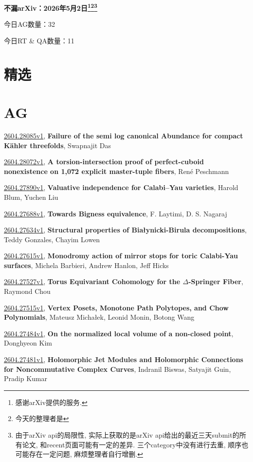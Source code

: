 \documentclass[9pt, a4paper]{article}
\theoremstyle{plain}
\theoremstyle{definition}
\theoremstyle{remark}
\newcommand{\arxiv}[3]{\href{https://arxiv.org/abs/#1}{#1}, \textbf{\textcolor{arxivblue}{#2}}, #3}
\newcommand{\AGnumber}{32}
\newcommand{\RTQAnumber}{11}
\newcommand{\NewestDate}{2026年5月2日}
\newcommand{\todayarXiver}{} %
\begin{document}
\begin{center}
    \Huge\textbf{不漏arXiv：\NewestDate\footnote{感谢arXiv提供的服务.}\footnote{今天的整理者是\todayarXiver}\footnote{由于arXiv api的局限性, 实际上获取的是arXiv api给出的最近三天submit的所有论文, 和recent页面可能有一定的差异. 三个category中没有进行去重, 顺序也可能存在一定问题, 麻烦整理者自行增删.}} \\
\end{center}

\setcounter{section}{-1}

\begin{center}
    今日AG数量：\AGnumber
    
    今日RT \& QA数量：\RTQAnumber
    
\end{center}


\section{精选}


\section{AG}
\arxiv{2604.28085v1}{Failure of the semi log canonical Abundance for compact Kähler threefolds}{Swapnajit Das}

\arxiv{2604.28072v1}{A torsion-intersection proof of perfect-cuboid nonexistence on 1,072 explicit master-tuple fibers}{René Peschmann}

\arxiv{2604.27890v1}{Valuative independence for Calabi--Yau varieties}{Harold Blum, Yuchen Liu}

\arxiv{2604.27688v1}{Towards Bigness equivalence}{F. Laytimi, D. S. Nagaraj}

\arxiv{2604.27634v1}{Structural properties of Białynicki-Birula decompositions}{Teddy Gonzales, Chayim Lowen}

\arxiv{2604.27615v1}{Monodromy action of mirror stops for toric Calabi-Yau surfaces}{Michela Barbieri, Andrew Hanlon, Jeff Hicks}

\arxiv{2604.27527v1}{Torus Equivariant Cohomology for the $Δ$-Springer Fiber}{Raymond Chou}

\arxiv{2604.27515v1}{Vertex Posets, Monotone Path Polytopes, and Chow Polynomials}{Mateusz Michałek, Leonid Monin, Botong Wang}

\arxiv{2604.27484v1}{On the normalized local volume of a non-closed point}{Donghyeon Kim}

\arxiv{2604.27481v1}{Holomorphic Jet Modules and Holomorphic Connections for Noncommutative Complex Curves}{Indranil Biswas, Satyajit Guin, Pradip Kumar}
\end{document}
